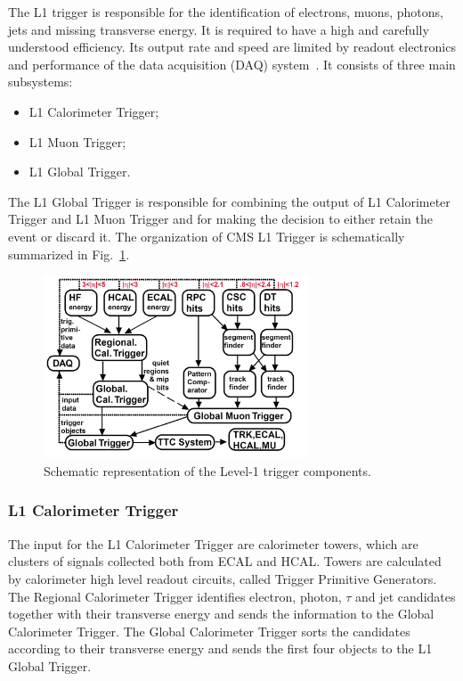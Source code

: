 The L1 trigger is responsible for the identification of electrons, muons, photons, jets and missing transverse energy. It is required to have a high and carefully understood efficiency. Its output rate and speed are limited by readout electronics and performance of the data
acquisition (DAQ) system~\cite{Cittolin:578006}. It consists of three main subsystems:
\begin{itemize}
\item L1 Calorimeter Trigger;
\item L1 Muon Trigger;
\item L1 Global Trigger.
\end{itemize}
The L1 Global Trigger is responsible for combining the output of L1 Calorimeter
Trigger and L1 Muon Trigger and for making the decision to either retain the event or discard it. The organization of CMS L1 Trigger is schematically summarized in Fig.~\ref{fig:trigL1}.
\begin{figure}[htb]
\centering
\includegraphics[width=0.7\textwidth]{images/trigL1.png}
\caption{Schematic representation of the Level-1 trigger components.}\label{fig:trigL1}
\end{figure}

\subsubsection{L1 Calorimeter Trigger}

The input for the L1 Calorimeter Trigger are calorimeter towers, which are clusters of signals collected both from ECAL and HCAL. Towers are calculated by calorimeter high level readout circuits, called Trigger Primitive Generators. The Regional Calorimeter Trigger identifies electron, photon, $\tau$ and jet candidates together with their transverse energy and sends the information to the Global Calorimeter Trigger. The Global Calorimeter Trigger sorts the candidates according to their transverse energy and sends the first four objects to the L1 Global Trigger.

